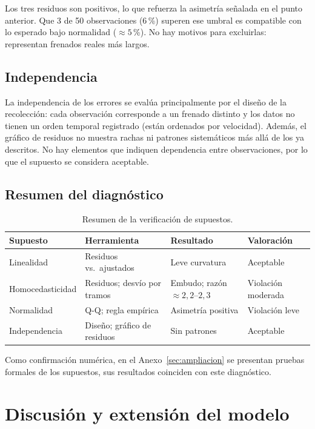 \documentclass[12pt,a4paper]{article}
\begin{document}
Los tres residuos son positivos, lo que refuerza la asimetría señalada en el punto anterior. Que 3 de 50 observaciones (6\,\%) superen ese umbral es compatible con lo esperado bajo normalidad ($\approx 5$\,\%). No hay motivos para excluirlas: representan frenados reales más largos.

\subsection{Independencia}

La independencia de los errores se evalúa principalmente por el diseño de la recolección: cada observación corresponde a un frenado distinto y los datos no tienen un orden temporal registrado (están ordenados por velocidad). Además, el gráfico de residuos no muestra rachas ni patrones sistemáticos más allá de los ya descritos. No hay elementos que indiquen dependencia entre observaciones, por lo que el supuesto se considera aceptable.

\subsection{Resumen del diagnóstico}

\begin{table}[H]
\centering
\caption{Resumen de la verificación de supuestos.}
\small
\begin{tabular}{llll}
\toprule
\textbf{Supuesto} & \textbf{Herramienta} & \textbf{Resultado} & \textbf{Valoración} \\
\midrule
Linealidad & Residuos vs.\ ajustados & Leve curvatura & Aceptable \\
Homocedasticidad & Residuos; desvío por tramos & Embudo; razón $\approx 2{,}2$--$2{,}3$ & Violación moderada \\
Normalidad & Q-Q; regla empírica & Asimetría positiva & Violación leve \\
Independencia & Diseño; gráfico de residuos & Sin patrones & Aceptable \\
\bottomrule
\end{tabular}
\end{table}

Como confirmación numérica, en el Anexo~\ref{sec:ampliacion} se presentan pruebas formales de los supuestos, sus resultados coinciden con este diagnóstico.

\section{Discusión y extensión del modelo}
\label{sec:discusion}
\end{document}
